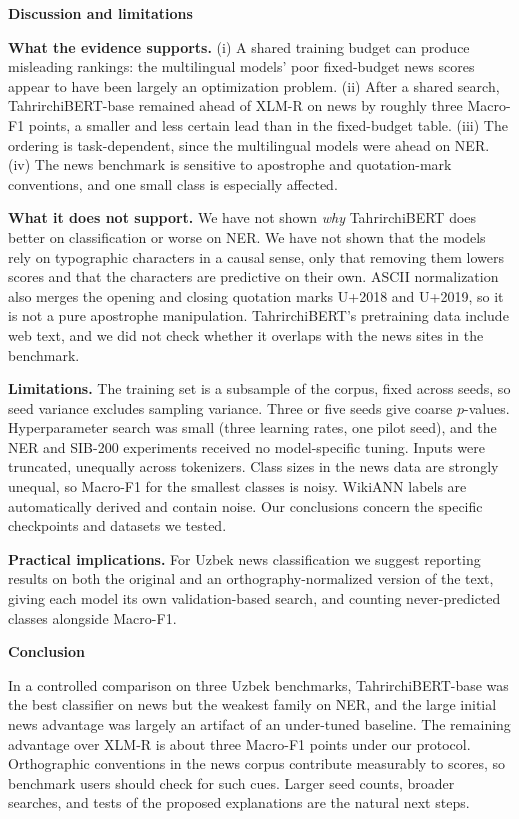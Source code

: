 \documentclass[11pt]{book}
\begin{document}
\begin{center}
\textbf{Discussion and limitations}
\end{center}

\textbf{What the evidence supports.} (i) A shared training budget can produce misleading rankings: the multilingual models' poor fixed-budget news scores appear to have been largely an optimization problem. (ii) After a shared search, TahrirchiBERT-base remained ahead of XLM-R on news by roughly three Macro-F1 points, a smaller and less certain lead than in the fixed-budget table. (iii) The ordering is task-dependent, since the multilingual models were ahead on NER. (iv) The news benchmark is sensitive to apostrophe and quotation-mark conventions, and one small class is especially affected.

\textbf{What it does not support.} We have not shown \emph{why} TahrirchiBERT does better on classification or worse on NER. We have not shown that the models rely on typographic characters in a causal sense, only that removing them lowers scores and that the characters are predictive on their own. ASCII normalization also merges the opening and closing quotation marks U+2018 and U+2019, so it is not a pure apostrophe manipulation. TahrirchiBERT's pretraining data include web text, and we did not check whether it overlaps with the news sites in the benchmark.

\textbf{Limitations.} The training set is a subsample of the corpus, fixed across seeds, so seed variance excludes sampling variance. Three or five seeds give coarse $p$-values. Hyperparameter search was small (three learning rates, one pilot seed), and the NER and SIB-200 experiments received no model-specific tuning. Inputs were truncated, unequally across tokenizers. Class sizes in the news data are strongly unequal, so Macro-F1 for the smallest classes is noisy. WikiANN labels are automatically derived and contain noise. Our conclusions concern the specific checkpoints and datasets we tested.

\textbf{Practical implications.} For Uzbek news classification we suggest reporting results on both the original and an orthography-normalized version of the text, giving each model its own validation-based search, and counting never-predicted classes alongside Macro-F1.

\begin{center}
\textbf{Conclusion}
\end{center}

In a controlled comparison on three Uzbek benchmarks, TahrirchiBERT-base was the best classifier on news but the weakest family on NER, and the large initial news advantage was largely an artifact of an under-tuned baseline. The remaining advantage over XLM-R is about three Macro-F1 points under our protocol. Orthographic conventions in the news corpus contribute measurably to scores, so benchmark users should check for such cues. Larger seed counts, broader searches, and tests of the proposed explanations are the natural next steps.
\end{document}
